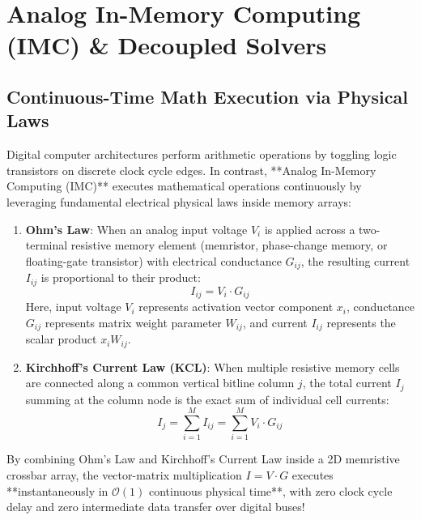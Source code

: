 \chapter{Analog In-Memory Computing (IMC) \& Decoupled Solvers}
\label{ch:analog_imc}

\section{Continuous-Time Math Execution via Physical Laws}
Digital computer architectures perform arithmetic operations by toggling logic transistors on discrete clock cycle edges. In contrast, **Analog In-Memory Computing (IMC)** executes mathematical operations continuously by leveraging fundamental electrical physical laws inside memory arrays:

\begin{enumerate}[leftmargin=*]
    \item \textbf{Ohm's Law}: When an analog input voltage $V_i$ is applied across a two-terminal resistive memory element (memristor, phase-change memory, or floating-gate transistor) with electrical conductance $G_{ij}$, the resulting current $I_{ij}$ is proportional to their product:
    \begin{equation}
    I_{ij} = V_i \cdot G_{ij}
    \end{equation}
    Here, input voltage $V_i$ represents activation vector component $x_i$, conductance $G_{ij}$ represents matrix weight parameter $W_{ij}$, and current $I_{ij}$ represents the scalar product $x_i W_{ij}$.
    
    \item \textbf{Kirchhoff's Current Law (KCL)}: When multiple resistive memory cells are connected along a common vertical bitline column $j$, the total current $I_j$ summing at the column node is the exact sum of individual cell currents:
    \begin{equation}
    I_j = \sum_{i=1}^M I_{ij} = \sum_{i=1}^M V_i \cdot G_{ij}
    \end{equation}
\end{enumerate}

\begin{mathbox}
By combining Ohm's Law and Kirchhoff's Current Law inside a 2D memristive crossbar array, the vector-matrix multiplication $I = V \cdot G$ executes **instantaneously in $\mathcal{O}(1)$ continuous physical time**, with zero clock cycle delay and zero intermediate data transfer over digital buses!
\end{mathbox}

